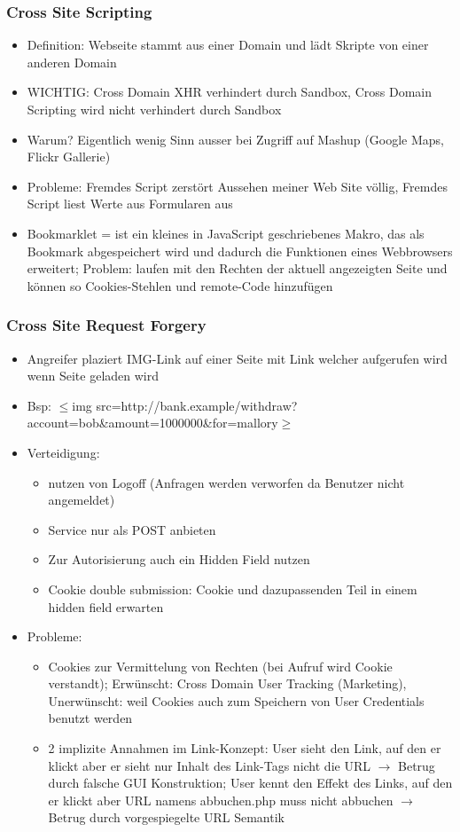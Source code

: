 \documentclass{article} %
\begin{document}
	\subsubsection{Cross Site Scripting}
	\begin{itemize}
		\item Definition: Webseite stammt aus einer Domain und lädt Skripte von einer anderen Domain
		\item WICHTIG: Cross Domain XHR verhindert durch Sandbox, Cross Domain Scripting wird nicht verhindert durch Sandbox
		\item Warum? Eigentlich wenig Sinn ausser bei Zugriff auf Mashup (Google Maps, Flickr Gallerie)
		\item Probleme: Fremdes Script zerstört Aussehen meiner Web Site völlig, Fremdes Script liest Werte aus Formularen aus

		\item Bookmarklet = ist ein kleines in JavaScript geschriebenes Makro, das als Bookmark abgespeichert wird und dadurch die Funktionen eines Webbrowsers erweitert; Problem: laufen mit den Rechten der aktuell angezeigten Seite und können so Cookies-Stehlen und remote-Code hinzufügen
	\end{itemize}
	\subsubsection{Cross Site Request Forgery}
	\begin{itemize}
		\item Angreifer plaziert IMG-Link auf einer Seite mit Link welcher aufgerufen wird wenn Seite geladen wird
		\item Bsp: $\le$img src=\glqq http://bank.example/withdraw?account=bob\&amount=1000000\&for=mallory\grqq$\ge$
		\item Verteidigung: 
		\begin{itemize}
			\item nutzen von Logoff (Anfragen werden verworfen da Benutzer nicht angemeldet)
			\item Service nur als POST anbieten
			\item Zur Autorisierung auch ein Hidden Field nutzen
			\item Cookie double submission: Cookie und dazupassenden Teil in einem hidden field erwarten
		\end{itemize}
		\item Probleme:
		\begin{itemize}
			\item Cookies zur Vermittelung von Rechten (bei Aufruf wird Cookie verstandt); Erwünscht: Cross Domain User Tracking (Marketing), Unerwünscht: weil Cookies auch zum Speichern von User Credentials benutzt werden
			\item 2 implizite Annahmen im Link-Konzept: User sieht den Link, auf den er klickt aber er sieht nur Inhalt des Link-Tags nicht die URL $\rightarrow$ Betrug durch falsche GUI Konstruktion; User kennt den Effekt des Links, auf den er klickt aber URL namens abbuchen.php muss nicht abbuchen $\rightarrow$ Betrug durch vorgespiegelte URL Semantik
		\end{itemize}
	\end{itemize}
\end{document}
